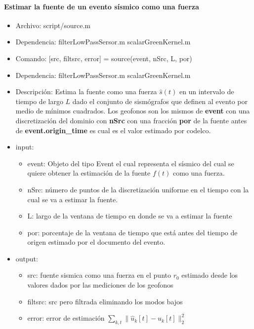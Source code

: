 \paragraph{Estimar la fuente de un evento sísmico como una fuerza}
\begin{itemize}
  \item Archivo: script/source.m
  \item Dependencia:   filterLowPassSersor.m scalarGreenKernel.m
  \item Comando: [src, filtsrc, error] = source(event, nSrc, L, por)
  \item Dependencia:  filterLowPassSersor.m scalarGreenKernel.m
 
  \item Descripción: Estima la fuente como una fuerza $\hat{s}(t)$ en un intervalo de 
  tiempo de largo $L$ dado el conjunto de sismógrafos que definen al evento por medio
  de mínimos cuadrados. Los geofonos son los mismos de  \textbf{event} con una 
  discretización del dominio con \textbf{nSrc} con una
  fracción \textbf{por} de la fuente antes de \textbf{event.origin\_time} es
  cual es el valor estimado por codelco.
  \item input: 
    \begin{itemize}
    \item event: Objeto del tipo Event el cual representa el sísmico del cual se
    quiere obtener la estimación de la fuente $f(t)$ como una fuerza.
    \item nSrc: número de puntos de la discretización uniforme en el tiempo con
    la cual se va a estimar la fuente.
    \item L: largo de la ventana de tiempo en donde se va a estimar la fuente
    \item por: porcentaje de la ventana de tiempo que está antes del tiempo de
    origen estimado por el documento del evento.
    \end{itemize}
  \item output:
  	\begin{itemize}
  	  \item src: fuente sismica como una fuerza en el punto $r_0$ estimado desde
  	  los valores dados por las mediciones de los geofonos
  	  \item filtsrc: src pero filtrada eliminando los modos bajos
  	  \item error: error de estimación $\sum_{k,t} \|\hat{u}_k[t]
  	  - u_k[t]\|_2^2$
  	\end{itemize}
\end{itemize}

